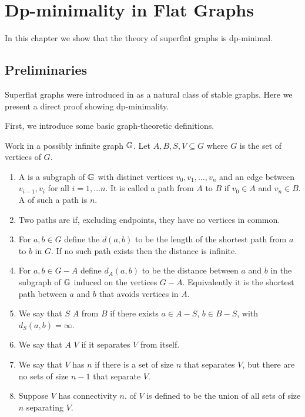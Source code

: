 \chapter{Dp-minimality in Flat Graphs}

In this chapter we show that the theory of superflat graphs is dp-minimal.

\section{Preliminaries}

Superflat graphs were introduced in \cite{stable_graphs} as a natural class of stable graphs. Here we present a direct proof showing dp-minimality.

First, we introduce some basic graph-theoretic definitions.
\begin{Definition}
  Work in a possibly infinite graph $\mathbb G$. Let $A, B, S, V \subseteq G$ where $G$ is the set of vertices of $G$.
  \begin{enumerate}
  \item A  is a subgraph of $\mathbb G$ with distinct vertices $v_0, v_1, \ldots, v_n$ and an edge between $v_{i-1}, v_i$ for all $i = 1, \ldots n$.
    It is called a path from $A$ to $B$ if $v_0 \in A$ and $v_n \in B$.
    A  of such a path is $n$.
  \item Two paths are  if, excluding endpoints, they have no vertices in common.
  \item For $a,b \in G$ define the  $d(a,b)$ to be the length of the shortest path from $a$ to $b$ in $G$.
    If no such path exists then the distance is infinite.
  \item For $a,b \in G - A$ define $d_A(a,b)$ to be the distance between $a$ and $b$ in the subgraph of $\mathbb G$
    induced on the vertices $G - A$. Equivalently it is the shortest path between $a$ and $b$ that avoids vertices in $A$.
  \item We say that $S$  $A$ from $B$ if there exists $a \in A - S$, $b \in B - S$, with $d_S(a,b) = \infty$.
  \item We say that $A$  $V$ if it separates $V$ from itself.
  \item We say that $V$ has  $n$ if there is a set of size $n$ that separates $V$,
    but there are no sets of size $n-1$ that separate $V$.
  \item Suppose $V$ has connectivity $n$.  of $V$ is defined to be the union of all sets of size $n$ separating $V$.
  \end{enumerate}
\end{Definition}

